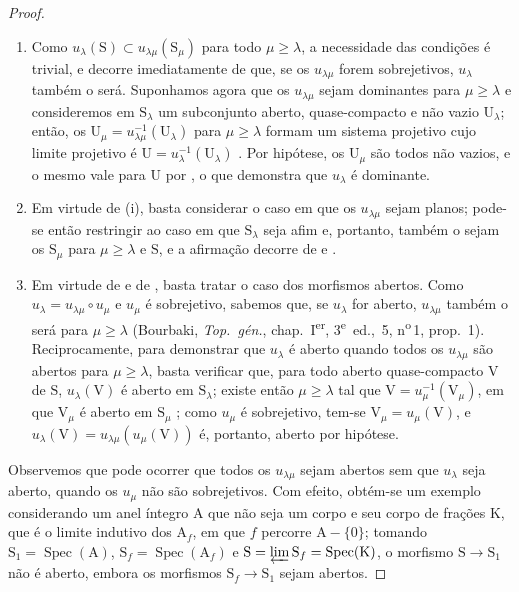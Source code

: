 \begin{proof}
\begin{enumerate}[label=(\roman*)]
  \item Como $u_\lambda(\mathrm{S})\subset u_{\lambda\mu}(\mathrm{S}_\mu)$ para todo $\mu\geqslant\lambda$, a necessidade das condições é trivial, e decorre imediatamente de  que, se os $u_{\lambda\mu}$ forem sobrejetivos, $u_\lambda$ também o será.
Suponhamos agora que os $u_{\lambda\mu}$ sejam dominantes para $\mu\geqslant\lambda$ e consideremos em $\mathrm{S}_\lambda$ um subconjunto aberto, quase-compacto e não vazio $\mathrm{U}_\lambda$; então, os $\mathrm{U}_\mu=u_{\lambda\mu}^{-1}(\mathrm{U}_\lambda)$ para $\mu\geqslant\lambda$ formam um sistema projetivo cujo limite projetivo é $\mathrm{U}=u_\lambda^{-1}(\mathrm{U}_\lambda)$ .
Por hipótese, os $\mathrm{U}_\mu$ são todos não vazios, e o mesmo vale para $\mathrm{U}$ por , o que demonstra que $u_\lambda$ é dominante.

  \item Em virtude de (i), basta considerar o caso em que os $u_{\lambda\mu}$ sejam planos; pode-se então restringir ao caso em que $\mathrm{S}_\lambda$ seja afim e, portanto, também o sejam os $\mathrm{S}_\mu$ para $\mu\geqslant\lambda$ e $\mathrm{S}$, e a afirmação decorre de  e .

  \item Em virtude de  e de , basta tratar o caso dos morfismos abertos.
Como $u_\lambda=u_{\lambda\mu}\circ u_\mu$ e $u_\mu$ é sobrejetivo, sabemos que, se $u_\lambda$ for aberto, $u_{\lambda\mu}$ também o será para $\mu\geqslant\lambda$ (Bourbaki, \emph{Top.\ g\'{e}n.}, chap.~I\textsuperscript{er}, 3\textsuperscript{e}~ed., \textsection\,5, n\textsuperscript{o}\,1, prop.~1).
Reciprocamente, para demonstrar que $u_\lambda$ é aberto quando todos os $u_{\lambda\mu}$ são abertos para $\mu\geqslant\lambda$, basta verificar que, para todo aberto quase-compacto $\mathrm{V}$ de $\mathrm{S}$, $u_\lambda(\mathrm{V})$ é aberto em $\mathrm{S}_\lambda$; existe então $\mu\geqslant\lambda$ tal que $\mathrm{V}=u_\mu^{-1}(\mathrm{V}_\mu)$, em que $\mathrm{V}_\mu$ é aberto em $\mathrm{S}_\mu$ ; como $u_\mu$ é sobrejetivo, tem-se $\mathrm{V}_\mu=u_\mu(\mathrm{V})$, e $u_\lambda(\mathrm{V})=u_{\lambda\mu}(u_\mu(\mathrm{V}))$ é, portanto, aberto por hipótese.
\end{enumerate}

Observemos que pode ocorrer que todos os $u_{\lambda\mu}$ sejam abertos sem que $u_\lambda$ seja aberto, quando os $u_\mu$ não são sobrejetivos.
Com efeito, obtém-se um exemplo considerando um anel íntegro $\mathrm{A}$ que não seja um corpo e seu corpo de frações $\mathrm{K}$, que é o limite indutivo dos $\mathrm{A}_f$, em que $f$ percorre $\mathrm{A}-\{0\}$; tomando $\mathrm{S}_1=\operatorname{Spec}(\mathrm{A})$, $\mathrm{S}_f=\operatorname{Spec}(\mathrm{A}_f)$ e $\mathrm{S}=\varprojlim\mathrm{S}_f=\operatorname{Spec}(\mathrm{K})$, o morfismo $\mathrm{S}\to\mathrm{S}_1$ não é aberto, embora os morfismos $\mathrm{S}_f\to\mathrm{S}_1$ sejam abertos.
\end{proof}

